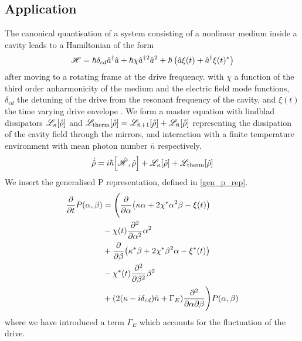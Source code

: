 \subsection{Application}
The canonical quantisation of a system consisting of a nonlinear medium inside a cavity leads to a Hamiltonian of the form 
\begin{equation}
  \mathscr{H} = \hbar \delta_{cd} {\hat{a}^\dagger} \hat{a} + \hbar \chi {\hat{a}^\dagger}{}^ 2 \hat{a}{}^ 2 + \hbar \left( \hat{a} \xi(t) + {\hat{a}^\dagger} \xi(t)^* \right) 
\end{equation}
after moving to a rotating frame at the drive frequency.
with $\chi$ a function of the third order anharmonicity of the medium and the electric field mode functions, $\delta_{cd}$ the detuning of the drive from the resonant frequency of the cavity, and $\xi(t)$ the time varying drive envelope \cite{Drummond1979}.
We form a master equation with lindblad dissipators $\mathscr{L}_{\kappa}[\hat{\rho}]$ and $\mathscr{L}_{\text{therm}}[\hat{\rho}] = \mathscr{L}_{\bar{n}+1}[\hat{\rho}] +  \mathscr{L}_{\bar{n}}[\hat{\rho}]$ representing the dissipation of the cavity field through the mirrors, and interaction with a finite temperature environment with mean photon number $\bar{n}$ respectively.
\begin{equation}
  \dot{\dens} = i\hbar\comm{\ham}{\dens} + \mathscr{L}_{\kappa}[\dens] + \mathscr{L}_{\text{therm}}[\dens]
\end{equation}
We insert the generalised P representation, defined in \cref{gen_p_rep}.
\begin{align}
  \pdv{t} P(\alpha, \beta)  &= \Bigg(\pdv{\alpha} (\kappa \alpha + 2 \chi^* \alpha^2 \beta - \xi(t) )\\ 
                            &- \chi(t) \pdv[2]{\alpha} \alpha^2\\
                            &+ \pdv{\beta} (\kappa^* \beta + 2\chi^* \beta^2 \alpha - \xi^*(t))\\
                            &- \chi^*(t) \pdv[2]{\beta} \beta^2\\
                            &+ (2(\kappa - i\delta_{cd})\bar{n} + \Gamma_E ) \pdv{}{\alpha}{\beta}\Bigg) P(\alpha, \beta)
\end{align}
where we have introduced a term $\Gamma_E$ which accounts for the fluctuation of the drive.

